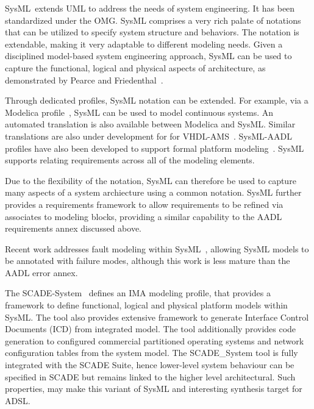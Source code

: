 SysML~\cite{SysML}extends UML to address the needs of system engineering. It has been standardized under the OMG. SysML comprises a very rich palate of notations that can be utilized to specify system structure and behaviors.  The notation is extendable, making it very adaptable to different modeling needs. Given a disciplined model-based system engineering approach, SysML can be used to capture the functional, logical and physical aspects of architecture, as demonstrated by Pearce and Friedenthal~\cite{pearce2013practical}.

Through dedicated profiles, SysML notation can be extended.  For example, via a Modelica profile~\cite{paredis20105}, SysML can be used to model continuous systems. An automated translation is also available between Modelica and SysML.  Similar translations are also under development for for VHDL-AMS~\cite{verries2013case}. SysML-AADL profiles have also been developed to support formal platform modeling~\cite{behjati2011extending,cofer2012compositional}. SysML supports relating requirements across all of the modeling elements.

Due to the flexibility of the notation, SysML can therefore be used to capture many aspects of a system archiecture using a common notation. SysML further provides a requirements framework to allow requirements to be refined via associates to modeling  blocks, providing a similar capability to the AADL requirements annex discussed above.

Recent work addresses fault modeling within SysML~\cite{pearce2013practical}, allowing SysML models to be annotated with failure modes, although this work is less mature than the AADL error annex.

The SCADE-System~\cite{scade} defines an IMA modeling profile, that provides a framework to define  functional, logical and physical platform models within SysML. The tool also provides extensive framework to generate Interface Control Documents (ICD) from integrated  model. The tool additionally provides code generation to configured commercial partitioned operating systems  and network configuration tables from the system model.  The SCADE\_System tool is fully integrated with the SCADE
Suite, hence lower-level system behaviour can be specified in SCADE but remains  linked to the higher level architectural.  Such properties, may make this variant of SysML and interesting synthesis target for ADSL.

